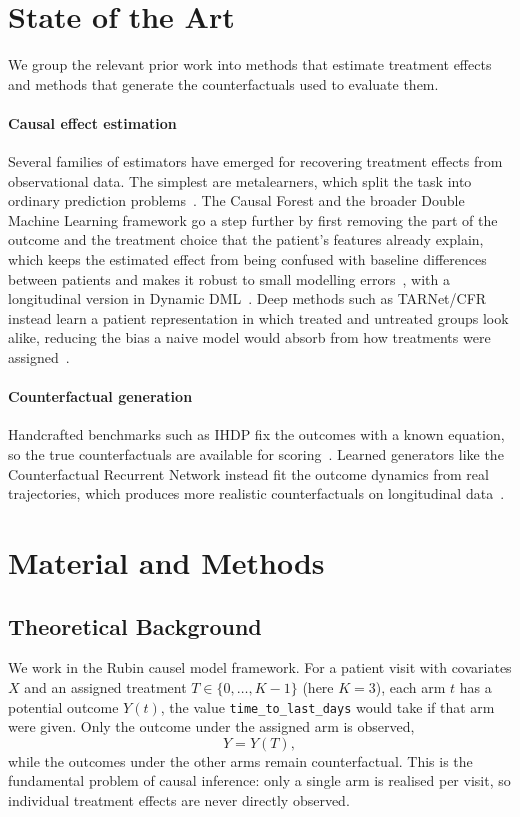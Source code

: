 \documentclass{article}
\begin{document}
\section{State of the Art}
We group the relevant prior work into methods that estimate treatment effects and
methods that generate the counterfactuals used to evaluate them.

\paragraph{Causal effect estimation}
Several families of estimators have emerged for recovering treatment effects from observational data. The simplest are metalearners, which split the task into ordinary prediction problems~\cite{K_nzel_2019}. The Causal Forest and the broader Double Machine Learning framework go a step further by first removing the part of the outcome and the treatment choice that the patient's features already explain, which keeps the estimated effect from being confused with baseline differences between patients and makes it robust to small modelling errors~\cite{chernozhukov2024doubledebiasedmachinelearningtreatment}, with a longitudinal version in Dynamic DML~\cite{lewis2021double}. Deep methods such as TARNet/CFR instead learn a patient representation in which treated and untreated groups look alike, reducing the bias a naive model would absorb from how treatments were assigned~\cite{shalit2017estimatingindividualtreatmenteffect}.

\paragraph{Counterfactual generation}
Handcrafted benchmarks such as IHDP fix the outcomes with a known equation, so the
true counterfactuals are available for scoring~\cite{shalit2017estimatingindividualtreatmenteffect}. Learned
generators like the Counterfactual Recurrent Network instead fit the outcome
dynamics from real trajectories, which produces more realistic counterfactuals on
longitudinal data~\cite{bica2020estimatingcounterfactualtreatmentoutcomes}.



\section{Material and Methods}

\subsection{Theoretical Background}
We work in the Rubin causel model framework. For a patient visit with covariates $X$ and an assigned treatment
$T \in \{0,\dots,K-1\}$ (here $K=3$), each arm $t$ has a potential outcome $Y(t)$,
the value \texttt{time\_to\_last\_days} would take if that arm were given. Only the
outcome under the assigned arm is observed,
\begin{equation}
    Y = Y(T),
\end{equation}
while the outcomes under the other arms remain counterfactual. This is the
fundamental problem of causal inference: only a single arm is
realised per visit, so individual treatment effects are never directly observed.
\end{document}
